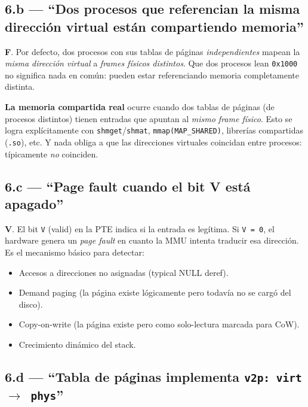 \documentclass[11pt,a4paper]{article}
\begin{document}
\subsection*{6.b --- ``Dos procesos que referencian la misma dirección virtual están compartiendo memoria''}

\begin{respuesta}
\textbf{F}. Por defecto, dos procesos con sus tablas de páginas
\emph{independientes} mapean la \emph{misma dirección virtual} a
\emph{frames físicos distintos}. Que dos procesos lean
\texttt{0x1000} no significa nada en común: pueden estar
referenciando memoria completamente distinta.

\textbf{La memoria compartida real} ocurre cuando dos tablas de
páginas (de procesos distintos) tienen entradas que apuntan al
\emph{mismo frame físico}. Esto se logra explícitamente con
\texttt{shmget}/\texttt{shmat}, \texttt{mmap(MAP\_SHARED)}, librerías
compartidas (\texttt{.so}), etc. Y nada obliga a que las direcciones
virtuales coincidan entre procesos: típicamente \emph{no} coinciden.
\end{respuesta}

\subsection*{6.c --- ``Page fault cuando el bit V está apagado''}

\begin{respuesta}
\textbf{V}. El bit \texttt{V} (valid) en la PTE indica si la entrada
es legítima. Si \texttt{V = 0}, el hardware genera un \emph{page
fault} en cuanto la MMU intenta traducir esa dirección. Es el
mecanismo básico para detectar:

\begin{itemize}[leftmargin=*,nosep]
    \item Accesos a direcciones no asignadas (typical NULL deref).
    \item Demand paging (la página existe lógicamente pero todavía
        no se cargó del disco).
    \item Copy-on-write (la página existe pero como solo-lectura
        marcada para CoW).
    \item Crecimiento dinámico del stack.
\end{itemize}
\end{respuesta}

\subsection*{6.d --- ``Tabla de páginas implementa \texttt{v2p: virt $\to$ phys}''}
\end{document}
